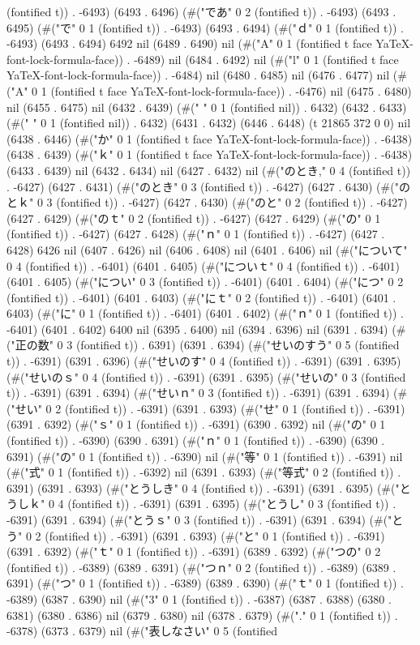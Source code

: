 (fontified t)) . -6493) (6493 . 6496) (#("であ" 0 2 (fontified t)) . -6493) (6493 . 6495) (#("で" 0 1 (fontified t)) . -6493) (6493 . 6494) (#("ｄ" 0 1 (fontified t)) . -6493) (6493 . 6494) 6492 nil (6489 . 6490) nil (#("A" 0 1 (fontified t face YaTeX-font-lock-formula-face)) . -6489) nil (6484 . 6492) nil (#("l" 0 1 (fontified t face YaTeX-font-lock-formula-face)) . -6484) nil (6480 . 6485) nil (6476 . 6477) nil (#("A" 0 1 (fontified t face YaTeX-font-lock-formula-face)) . -6476) nil (6475 . 6480) nil (6455 . 6475) nil (6432 . 6439) (#(" " 0 1 (fontified nil)) . 6432) (6432 . 6433) (#(" " 0 1 (fontified nil)) . 6432) (6431 . 6432) (6446 . 6448) (t 21865 372 0 0) nil (6438 . 6446) (#("か" 0 1 (fontified t face YaTeX-font-lock-formula-face)) . -6438) (6438 . 6439) (#("ｋ" 0 1 (fontified t face YaTeX-font-lock-formula-face)) . -6438) (6433 . 6439) nil (6432 . 6434) nil (6427 . 6432) nil (#("のとき," 0 4 (fontified t)) . -6427) (6427 . 6431) (#("のとき" 0 3 (fontified t)) . -6427) (6427 . 6430) (#("のとｋ" 0 3 (fontified t)) . -6427) (6427 . 6430) (#("のと" 0 2 (fontified t)) . -6427) (6427 . 6429) (#("のｔ" 0 2 (fontified t)) . -6427) (6427 . 6429) (#("の" 0 1 (fontified t)) . -6427) (6427 . 6428) (#("ｎ" 0 1 (fontified t)) . -6427) (6427 . 6428) 6426 nil (6407 . 6426) nil (6406 . 6408) nil (6401 . 6406) nil (#("について" 0 4 (fontified t)) . -6401) (6401 . 6405) (#("についｔ" 0 4 (fontified t)) . -6401) (6401 . 6405) (#("につい" 0 3 (fontified t)) . -6401) (6401 . 6404) (#("につ" 0 2 (fontified t)) . -6401) (6401 . 6403) (#("にｔ" 0 2 (fontified t)) . -6401) (6401 . 6403) (#("に" 0 1 (fontified t)) . -6401) (6401 . 6402) (#("ｎ" 0 1 (fontified t)) . -6401) (6401 . 6402) 6400 nil (6395 . 6400) nil (6394 . 6396) nil (6391 . 6394) (#("正の数" 0 3 (fontified t)) . 6391) (6391 . 6394) (#("せいのすう" 0 5 (fontified t)) . -6391) (6391 . 6396) (#("せいのす" 0 4 (fontified t)) . -6391) (6391 . 6395) (#("せいのｓ" 0 4 (fontified t)) . -6391) (6391 . 6395) (#("せいの" 0 3 (fontified t)) . -6391) (6391 . 6394) (#("せいｎ" 0 3 (fontified t)) . -6391) (6391 . 6394) (#("せい" 0 2 (fontified t)) . -6391) (6391 . 6393) (#("せ" 0 1 (fontified t)) . -6391) (6391 . 6392) (#("ｓ" 0 1 (fontified t)) . -6391) (6390 . 6392) nil (#("の" 0 1 (fontified t)) . -6390) (6390 . 6391) (#("ｎ" 0 1 (fontified t)) . -6390) (6390 . 6391) (#("の" 0 1 (fontified t)) . -6390) nil (#("等" 0 1 (fontified t)) . -6391) nil (#("式" 0 1 (fontified t)) . -6392) nil (6391 . 6393) (#("等式" 0 2 (fontified t)) . 6391) (6391 . 6393) (#("とうしき" 0 4 (fontified t)) . -6391) (6391 . 6395) (#("とうしｋ" 0 4 (fontified t)) . -6391) (6391 . 6395) (#("とうし" 0 3 (fontified t)) . -6391) (6391 . 6394) (#("とうｓ" 0 3 (fontified t)) . -6391) (6391 . 6394) (#("とう" 0 2 (fontified t)) . -6391) (6391 . 6393) (#("と" 0 1 (fontified t)) . -6391) (6391 . 6392) (#("ｔ" 0 1 (fontified t)) . -6391) (6389 . 6392) (#("つの" 0 2 (fontified t)) . -6389) (6389 . 6391) (#("つｎ" 0 2 (fontified t)) . -6389) (6389 . 6391) (#("つ" 0 1 (fontified t)) . -6389) (6389 . 6390) (#("ｔ" 0 1 (fontified t)) . -6389) (6387 . 6390) nil (#("3" 0 1 (fontified t)) . -6387) (6387 . 6388) (6380 . 6381) (6380 . 6386) nil (6379 . 6380) nil (6378 . 6379) (#("." 0 1 (fontified t)) . -6378) (6373 . 6379) nil (#("表しなさい" 0 5 (fontified 